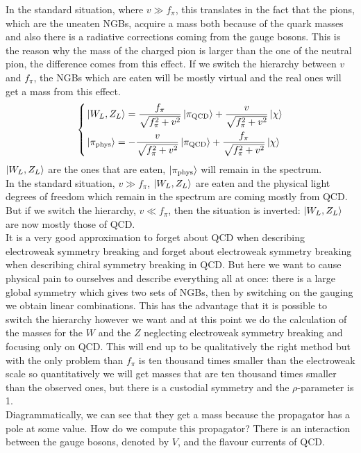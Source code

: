 \documentclass[../main.tex]{subfiles}
\begin{document}
In the standard situation, where $v\gg f_\pi$, this translates in the fact that the pions, which are the uneaten NGBs, acquire a mass both because of the quark masses and also there is a radiative corrections coming from the gauge bosons. This is the reason why the mass of the charged pion is larger than the one of the neutral pion, the difference comes from this effect. If we switch the hierarchy between $v$ and $f_\pi$, the NGBs which are eaten will be mostly virtual and the real ones will get a mass from this effect. 
\[
\left\{
\begin{aligned}
&\ket{W_L,Z_L}=\frac{f_\pi}{\sqrt{f_\pi^2+v^2}}\ket{\pi_{\text{QCD}}}+\frac{v}{\sqrt{f_\pi^2+v^2}}\ket{\chi}\\
&\ket{\pi_{\text{phys}}}=-\frac{v}{\sqrt{f_\pi^2+v^2}}\ket{\pi_{\text{QCD}}}+\frac{f_\pi}{\sqrt{f_\pi^2+v^2}}\ket{\chi}
\end{aligned}
\right.
\]
$\ket{W_L,Z_L}$ are the ones that are eaten, $\ket{\pi_{\text{phys}}}$ will remain in the spectrum.\\
In the standard situation, $v\gg f_\pi$, $\ket{W_L,Z_L}$ are eaten and the physical light degrees of freedom which remain in the spectrum are coming mostly from QCD. But if we switch the hierarchy, $v\ll f_\pi$, then the situation is inverted: $\ket{W_L,Z_L}$ are now mostly those of QCD.\\
It is a very good approximation to forget about QCD when describing electroweak symmetry breaking and forget about electroweak symmetry breaking when describing chiral symmetry breaking in QCD. But here we want to cause physical pain to ourselves and describe everything all at once: there is a large global symmetry which gives two sets of NGBs, then by switching on the gauging we obtain linear combinations. This has the advantage that it is possible to switch the hierarchy however we want and at this point we do the calculation of the masses for the $W$ and the $Z$ neglecting electroweak symmetry breaking and focusing only on QCD. This will end up to be qualitatively the right method but with the only problem than $f_\pi$ is ten thousand times smaller than the electroweak scale so quantitatively we will get masses that are ten thousand times smaller than the observed ones, but there is a custodial symmetry and the $\rho$-parameter is 1.\\
Diagrammatically, we can see that they get a mass because the propagator has a pole at some value. How do we compute this propagator? There is an interaction between the gauge bosons, denoted by $V$, and the flavour currents of QCD.%
\end{document}
